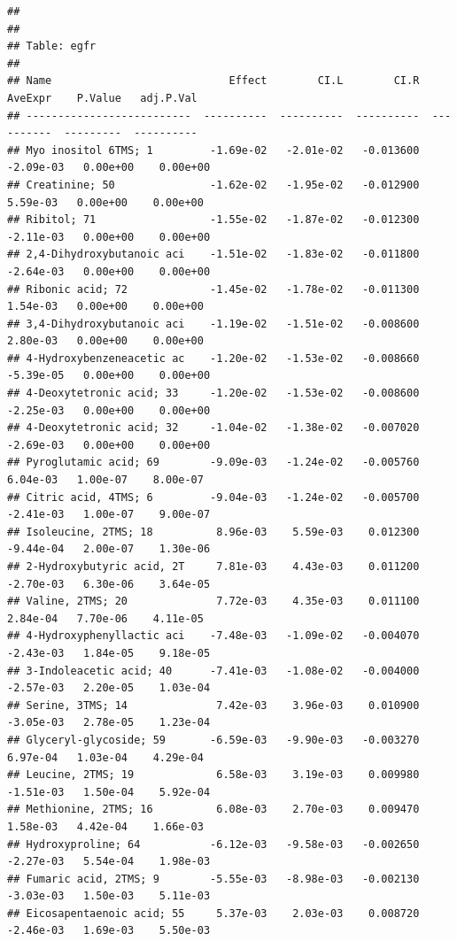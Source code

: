 \documentclass[]{article}
\begin{document}
\begin{verbatim}
## 
## 
## Table: egfr
## 
## Name                            Effect        CI.L        CI.R     AveExpr    P.Value   adj.P.Val
## --------------------------  ----------  ----------  ----------  ----------  ---------  ----------
## Myo inositol 6TMS; 1         -1.69e-02   -2.01e-02   -0.013600   -2.09e-03   0.00e+00    0.00e+00
## Creatinine; 50               -1.62e-02   -1.95e-02   -0.012900    5.59e-03   0.00e+00    0.00e+00
## Ribitol; 71                  -1.55e-02   -1.87e-02   -0.012300   -2.11e-03   0.00e+00    0.00e+00
## 2,4-Dihydroxybutanoic aci    -1.51e-02   -1.83e-02   -0.011800   -2.64e-03   0.00e+00    0.00e+00
## Ribonic acid; 72             -1.45e-02   -1.78e-02   -0.011300    1.54e-03   0.00e+00    0.00e+00
## 3,4-Dihydroxybutanoic aci    -1.19e-02   -1.51e-02   -0.008600    2.80e-03   0.00e+00    0.00e+00
## 4-Hydroxybenzeneacetic ac    -1.20e-02   -1.53e-02   -0.008660   -5.39e-05   0.00e+00    0.00e+00
## 4-Deoxytetronic acid; 33     -1.20e-02   -1.53e-02   -0.008600   -2.25e-03   0.00e+00    0.00e+00
## 4-Deoxytetronic acid; 32     -1.04e-02   -1.38e-02   -0.007020   -2.69e-03   0.00e+00    0.00e+00
## Pyroglutamic acid; 69        -9.09e-03   -1.24e-02   -0.005760    6.04e-03   1.00e-07    8.00e-07
## Citric acid, 4TMS; 6         -9.04e-03   -1.24e-02   -0.005700   -2.41e-03   1.00e-07    9.00e-07
## Isoleucine, 2TMS; 18          8.96e-03    5.59e-03    0.012300   -9.44e-04   2.00e-07    1.30e-06
## 2-Hydroxybutyric acid, 2T     7.81e-03    4.43e-03    0.011200   -2.70e-03   6.30e-06    3.64e-05
## Valine, 2TMS; 20              7.72e-03    4.35e-03    0.011100    2.84e-04   7.70e-06    4.11e-05
## 4-Hydroxyphenyllactic aci    -7.48e-03   -1.09e-02   -0.004070   -2.43e-03   1.84e-05    9.18e-05
## 3-Indoleacetic acid; 40      -7.41e-03   -1.08e-02   -0.004000   -2.57e-03   2.20e-05    1.03e-04
## Serine, 3TMS; 14              7.42e-03    3.96e-03    0.010900   -3.05e-03   2.78e-05    1.23e-04
## Glyceryl-glycoside; 59       -6.59e-03   -9.90e-03   -0.003270    6.97e-04   1.03e-04    4.29e-04
## Leucine, 2TMS; 19             6.58e-03    3.19e-03    0.009980   -1.51e-03   1.50e-04    5.92e-04
## Methionine, 2TMS; 16          6.08e-03    2.70e-03    0.009470    1.58e-03   4.42e-04    1.66e-03
## Hydroxyproline; 64           -6.12e-03   -9.58e-03   -0.002650   -2.27e-03   5.54e-04    1.98e-03
## Fumaric acid, 2TMS; 9        -5.55e-03   -8.98e-03   -0.002130   -3.03e-03   1.50e-03    5.11e-03
## Eicosapentaenoic acid; 55     5.37e-03    2.03e-03    0.008720   -2.46e-03   1.69e-03    5.50e-03

\end{verbatim}
\end{document}
